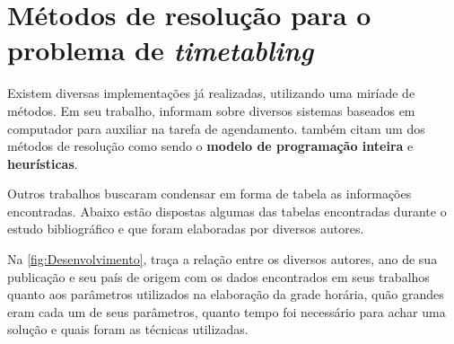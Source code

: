 \section{Métodos de resolução para o problema de \textit{timetabling}} \label{sec:resolucao}                                                    %



Existem diversas implementações já realizadas, utilizando uma miríade de métodos. Em seu trabalho,  informam sobre diversos sistemas baseados em computador para auxiliar na tarefa de agendamento.  também citam um dos métodos de resolução como sendo o \textbf{modelo de programação inteira} e \textbf{heurísticas}.

Outros trabalhos buscaram condensar em forma de tabela as informações encontradas. Abaixo estão dispostas algumas das tabelas encontradas durante o estudo bibliográfico e que foram elaboradas por diversos autores.

Na \autoref{fig:Desenvolvimento},  traça a relação entre os diversos autores, ano de sua publicação e seu país de origem com os dados encontrados em seus trabalhos quanto aos parâmetros utilizados na elaboração da grade horária, quão grandes eram cada um de seus parâmetros, quanto tempo foi necessário para achar uma solução e quais foram as técnicas utilizadas.

